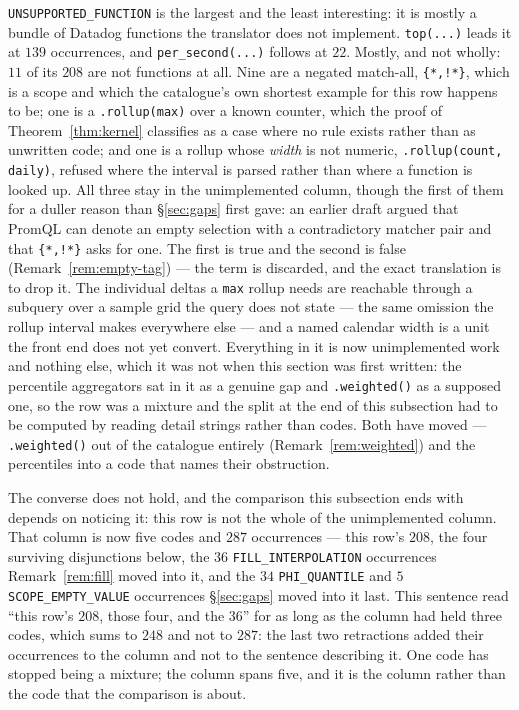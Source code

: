 
\texttt{UNSUPPORTED\_FUNCTION} is the largest and the least interesting: it is mostly a
bundle of Datadog functions the translator does not implement. \texttt{top(...)} leads
it at $139$ occurrences, and \texttt{per\_second(...)} follows at $22$.
Mostly, and not wholly: $11$ of its $208$ are not functions at all. Nine are a negated match-all,
\texttt{\{*,!*\}}, which is a scope and which the catalogue's own shortest example for
this row happens to be; one is a \texttt{.rollup(max)} over a known counter, which the
proof of Theorem~\ref{thm:kernel} classifies as a case where no rule exists rather than
as unwritten code; and one is a rollup whose \emph{width} is not numeric,
\texttt{.rollup(count, daily)}, refused where the interval is parsed rather than where a
function is looked up. All three stay in the unimplemented column, though the first of them for a duller
reason than \S\ref{sec:gaps} first gave: an earlier draft argued that PromQL can
denote an empty selection with a contradictory matcher pair and that \texttt{\{*,!*\}}
asks for one. The first is true and the second is false
(Remark~\ref{rem:empty-tag}) --- the term is discarded, and the exact translation is
to drop it. The individual deltas a
\texttt{max} rollup needs are reachable through a subquery over a sample grid the
query does not state --- the same omission the rollup interval makes everywhere else
--- and a
named calendar width is a unit the front end does not yet convert. Everything in it is now unimplemented
work and nothing else, which it was not when this section was first written: the
percentile aggregators sat in it as a genuine gap and \texttt{.weighted()} as a
supposed one, so the row was a mixture and the split at the end of this subsection had
to be computed by reading detail strings rather than codes. Both have moved ---
\texttt{.weighted()} out of the catalogue entirely (Remark~\ref{rem:weighted}) and the
percentiles into a code that names their obstruction.

The converse does not hold, and the comparison this subsection ends with depends on
noticing it: this row is not the whole of the unimplemented column. That column is now
five codes and $287$ occurrences --- this row's $208$, the four surviving disjunctions
below, the $36$ \texttt{FILL\_INTERPOLATION} occurrences Remark~\ref{rem:fill} moved
into it, and the $34$ \texttt{PHI\_QUANTILE} and $5$ \texttt{SCOPE\_EMPTY\_VALUE}
occurrences \S\ref{sec:gaps} moved into it last. This sentence read ``this row's $208$,
those four, and the $36$'' for as long as the column had held three codes, which sums to
$248$ and not to $287$: the last two retractions added their occurrences to the column
and not to the sentence describing it. One code has stopped being a mixture; the column
spans five, and it is the column rather than the code that the comparison is about.

